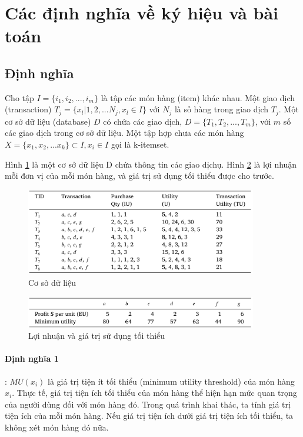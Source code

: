 \section{Các định nghĩa về ký hiệu và bài toán}

\subsection{Định nghĩa}

Cho tập $ I = \{i_1, i_2, ..., i_m\}$ là tập các món hàng (item) khác nhau. Một giao dịch (transaction) $T_j = \{x_l | 1, 2, ...N_j, x_l \in I \} $ với $N_j$ là số hàng trong giao dịch  $T_j$. Một cơ sở dữ liệu (database) $D$ có chứa các giao dịch, $D = \{T_1, T_2, ..., T_m\}$, với $m$ số các giao dịch trong cơ sở dữ liệu. Một tập hợp chưa các món hàng $X =\{ x_1, x_2, ... x_k \} \subset I, x_i \in I $ gọi là k-itemset. 

Hình \ref{fig:table2} là một cơ sở dữ liệu D chứa thông tin các giao dịchụ. Hình \ref{fig:table3} là lợi nhuận mỗi đơn vị của mỗi món hàng, và giá trị sử dụng tối thiểu được cho trước.



\begin{figure}[h]
\centering
\includegraphics[width=0.9\textwidth]{image/table/table2.PNG}
\caption{\label{fig:table2} Cơ sở dữ liệu}
\end{figure}

\begin{figure}[h]
\centering
\includegraphics[width=0.9\textwidth]{image/table/table3.PNG}
\caption{\label{fig:table3} Lợi nhuận và giá trị sử dụng tối thiểu}
\end{figure}

\paragraph{Định nghĩa 1}: $ MU(x_i) $ là giá trị tiện ít tối thiểu (minimum utility threshold) của món hàng $x_i$. Thực tế, giá trị tiện ích tối thiểu của món hàng thể hiện hạn mức quan trọng của người dùng đối với món hàng đó. Trong quá trình khai thác, ta tính giá trị tiện ích của mỗi món hàng. Nếu giá trị tiện ích dưới giá trị tiện ích tối thiểu, ta không xét món hàng đó nữa. 

